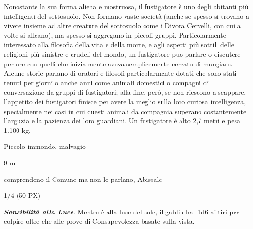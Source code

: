 \begin{multicols}{2}
{Nonostante la sua forma aliena e mostruosa, il fustigatore è uno degli abitanti più intelligenti del sottosuolo. Non formano vaste società (anche se spesso si trovano a vivere insieme ad altre creature del sottosuolo come i Divora Cervelli, con cui a volte si alleano), ma spesso si aggregano in piccoli gruppi. Particolarmente interessato alla filosofia della vita e della morte, e agli aspetti più sottili delle religioni più sinistre e crudeli del mondo, un fustigatore può parlare o discutere per ore con quelli che inizialmente aveva semplicemente cercato di mangiare. Alcune storie parlano di oratori e filosofi particolarmente dotati che sono stati tenuti per giorni o anche anni come animali domestici o compagni di conversazione da gruppi di fustigatori; alla fine, però, se non riescono a scappare, l'appetito dei fustigatori finisce per avere la meglio sulla loro curiosa intelligenza, specialmente nei casi in cui questi animali da compagnia superano costantemente l'arguzia e la pazienza dei loro guardiani.
Un fustigatore è alto 2,7 metri e pesa 1.100 kg.


\begin{description}[noitemsep, topsep=0pt, parsep=0pt, partopsep=0pt, itemsep=1pt, leftmargin=2.35cm,  labelwidth=2.2cm, itemindent=0cm, listparindent=0pt] %
\setlength{\baselineskip}{10pt}
\item[\textbf{Taglia/Tipo}] Piccolo immondo, malvagio
\item[\textbf{Caratt.}] 
\item[\textbf{Punti Ferita}] 
\item[\textbf{Movimento}] 9 m
\item[\textbf{Tiri Salvez.}] 
\item[\textbf{Sensi}] 
\item[\textbf{Linguaggi}] comprendono il Comune ma non lo parlano, Abissale
\item[\textbf{Sfida}] 1/4 (50 PX)
\end{description}
\smallskip

\emph{\textbf{Sensibilità alla Luce}}. Mentre è alla luce del sole, il gablin ha -1d6 ai tiri per colpire oltre che alle prove di Consapevolezza basate sulla vista.

}
\end{multicols}
